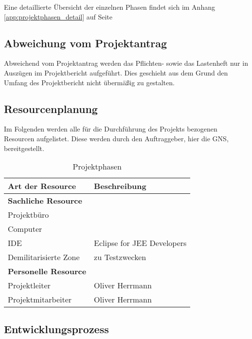\documentclass[12pt, xcolor=dvipsnames]{scrartcl}
\begin{document}
	Eine detaillierte Übersicht der einzelnen Phasen findet sich im Anhang \ref{app:projektphasen_detail} auf Seite \pageref{app:projektphasen_detail}
	

\subsection{Abweichung vom Projektantrag}

Abweichend vom Projektantrag werden das Pflichten- sowie das Lastenheft nur in Auszügen im Projektbericht aufgeführt. Dies geschieht aus dem Grund den Umfang des Projektbericht nicht übermäßig zu gestalten.

\subsection{Resourcenplanung}

Im Folgenden werden alle für die Durchführung des Projekts bezogenen Resourcen aufgelistet. Diese werden durch den Auftraggeber, hier die GNS, bereitgestellt.

\begin{table}[H]
	\centering
	\begin{tabular}{ll}

		\rowcolor{white!15}				
		\textbf{Art der Resource} & \textbf{Beschreibung} \\\hline		
		
		\rowcolor{MidnightBlue!15}				
		\textbf{Sachliche Resource} & \\
		Projektbüro & \\
		Computer & \\
		\hspace{1.5em} IDE & Eclipse for JEE Developers \\
		Demilitarisierte Zone & zu Testzwecken \\
		
		\rowcolor{MidnightBlue!15}			
		\textbf{Personelle Resource} & \\
		Projektleiter & Oliver Herrmann \\
		Projektmitarbeiter & Oliver Herrmann \\
	
			    
	\end{tabular}
	\caption{Projektphasen}
	\label{tab:projektphasen}
	\end{table}

\subsection{Entwicklungsprozess}
\end{document}
